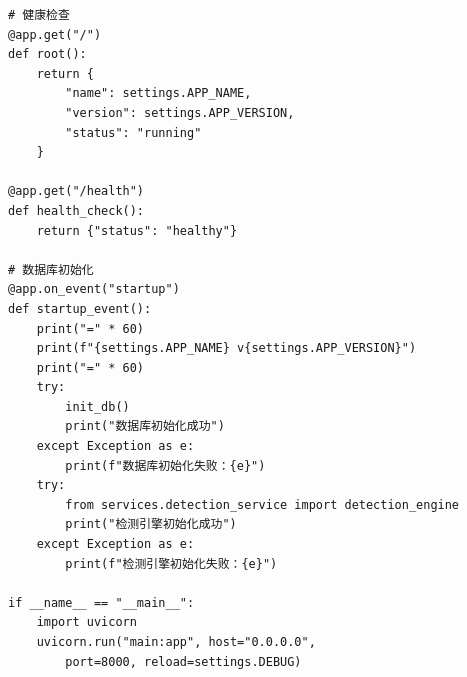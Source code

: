 \documentclass[a4paper,10pt]{article}
\begin{document}
\begin{lstlisting}
# 健康检查
@app.get("/")
def root():
    return {
        "name": settings.APP_NAME,
        "version": settings.APP_VERSION,
        "status": "running"
    }

@app.get("/health")
def health_check():
    return {"status": "healthy"}

# 数据库初始化
@app.on_event("startup")
def startup_event():
    print("=" * 60)
    print(f"{settings.APP_NAME} v{settings.APP_VERSION}")
    print("=" * 60)
    try:
        init_db()
        print("数据库初始化成功")
    except Exception as e:
        print(f"数据库初始化失败：{e}")
    try:
        from services.detection_service import detection_engine
        print("检测引擎初始化成功")
    except Exception as e:
        print(f"检测引擎初始化失败：{e}")

if __name__ == "__main__":
    import uvicorn
    uvicorn.run("main:app", host="0.0.0.0",
        port=8000, reload=settings.DEBUG)
\end{lstlisting}
\end{document}
